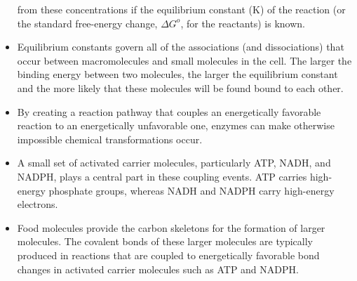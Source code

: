 \begin{itemize}
from these concentrations if the equilibrium constant (K) of the reaction
(or the standard free-energy change, $\Delta G^{o}$, for the reactants) is
known.
\item Equilibrium constants govern all of the associations (and dissociations)
that occur between macromolecules and small molecules in
the cell. The larger the binding energy between two molecules, the
larger the equilibrium constant and the more likely that these molecules
will be found bound to each other.
\item By creating a reaction pathway that couples an energetically favorable
reaction to an energetically unfavorable one, enzymes can make
otherwise impossible chemical transformations occur.
\item A small set of activated carrier molecules, particularly ATP, NADH,
and NADPH, plays a central part in these coupling events. ATP carries
high-energy phosphate groups, whereas NADH and NADPH carry
high-energy electrons.
\item Food molecules provide the carbon skeletons for the formation of
larger molecules. The covalent bonds of these larger molecules are
typically produced in reactions that are coupled to energetically favorable
bond changes in activated carrier molecules such as ATP and NADPH.
\end{itemize}
